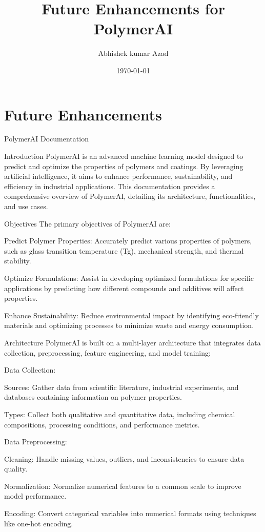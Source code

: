 \documentclass{article}
\title{Future Enhancements for PolymerAI}
\author{Abhishek kumar Azad}
\date{\today}
\begin{document}
	\maketitle
	\section{Future Enhancements}
	PolymerAI Documentation
	
	Introduction
	PolymerAI is an advanced machine learning model designed to predict and optimize the properties of polymers and coatings. By leveraging artificial intelligence, it aims to enhance performance, sustainability, and efficiency in industrial applications. This documentation provides a comprehensive overview of PolymerAI, detailing its architecture, functionalities, and use cases.
	
	Objectives
	The primary objectives of PolymerAI are:
	
	Predict Polymer Properties: Accurately predict various properties of polymers, such as glass transition temperature (Tg), mechanical strength, and thermal stability.
	
	Optimize Formulations: Assist in developing optimized formulations for specific applications by predicting how different compounds and additives will affect properties.
	
	Enhance Sustainability: Reduce environmental impact by identifying eco-friendly materials and optimizing processes to minimize waste and energy consumption.
	
	Architecture
	PolymerAI is built on a multi-layer architecture that integrates data collection, preprocessing, feature engineering, and model training:
	
	Data Collection:
	
	Sources: Gather data from scientific literature, industrial experiments, and databases containing information on polymer properties.
	
	Types: Collect both qualitative and quantitative data, including chemical compositions, processing conditions, and performance metrics.
	
	Data Preprocessing:
	
	Cleaning: Handle missing values, outliers, and inconsistencies to ensure data quality.
	
	Normalization: Normalize numerical features to a common scale to improve model performance.
	
	Encoding: Convert categorical variables into numerical formats using techniques like one-hot encoding.
	
\end{document}
